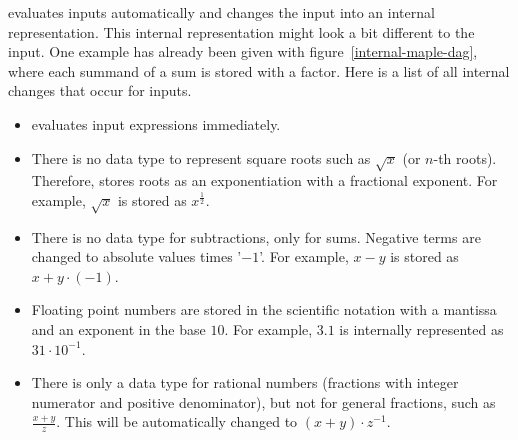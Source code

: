 


\Maple{} evaluates inputs automatically and changes the input into an internal representation. This internal representation might look a bit different to the input. One example has already been given with figure~\ref{internal-maple-dag}, where each summand of a sum is stored with a factor. Here is a list of all internal changes that occur for inputs.

\begin{itemize}
\item \Maple{} evaluates input expressions immediately.
\item There is no data type to represent square roots such as $\sqrt{x}$ (or $n$-th roots). Therefore, \Maple{} stores roots as an exponentiation with a fractional exponent. For example, $\sqrt{x}$ is stored as $x^{\frac{1}{2}}$.
\item There is no data type for subtractions, only for sums. Negative terms are changed to absolute values times '$-1$'. For example, $x-y$ is stored as $x + y \cdot (-1)$. 
\item Floating point numbers are stored in the scientific notation with a mantissa and an exponent in the base $10$. For example, $3.1$ is internally represented as $31 \cdot 10^{-1}$.
\item There is only a data type for rational numbers (fractions with integer numerator and positive denominator), but not for general fractions, such as $\frac{x+y}{z}$. This will be automatically changed to $(x+y)\cdot z^{-1}$.
\end{itemize}


